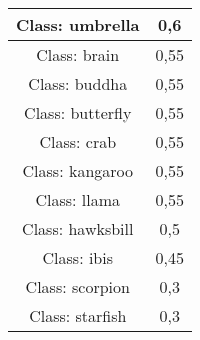 \begin{table}[H]
\begin{tabular}{|cc|}
\multicolumn{1}{|c|}{Class: umbrella}         & \multicolumn{1}{c|}{0,6}  \\ \hline
\multicolumn{1}{|c|}{Class: brain}            & \multicolumn{1}{c|}{0,55} \\ \hline
\multicolumn{1}{|c|}{Class: buddha}           & \multicolumn{1}{c|}{0,55} \\ \hline
\multicolumn{1}{|c|}{Class: butterfly}        & \multicolumn{1}{c|}{0,55} \\ \hline
\multicolumn{1}{|c|}{Class: crab}             & \multicolumn{1}{c|}{0,55} \\ \hline
\multicolumn{1}{|c|}{Class: kangaroo}         & \multicolumn{1}{c|}{0,55} \\ \hline
\multicolumn{1}{|c|}{Class: llama}            & \multicolumn{1}{c|}{0,55} \\ \hline
\multicolumn{1}{|c|}{Class: hawksbill}        & \multicolumn{1}{c|}{0,5}  \\ \hline
\multicolumn{1}{|c|}{Class: ibis}             & \multicolumn{1}{c|}{0,45} \\ \hline
\multicolumn{1}{|c|}{Class: scorpion}         & \multicolumn{1}{c|}{0,3}  \\ \hline
\multicolumn{1}{|c|}{Class: starfish}         & \multicolumn{1}{c|}{0,3}   \\ \hline
\end{tabular}
\end{table}



